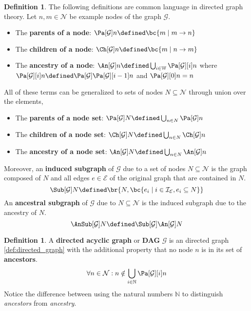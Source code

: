 \documentclass[aps, 10pt, english, twoside, pra, nofootinbib, longbibliography]{revtex4-1}
\theoremstyle{plain}
\theoremstyle{definition}
\newtheorem{definition}[theorem]{Definition}
\theoremstyle{remark}
\newcommand{\graph}{\mathcal{G}}
\newcommand{\nodes}{\mathcal{N}}
\newcommand{\edges}{\mathcal{E}}
\newcommand{\ind}{\mathcal{I}}
\newcommand{\term}[1]{\textcolor{Mahogany}{\textbf{#1}}}
\begin{document}
    \begin{definition}
        \label{def:graph_terms}
        The following definitions are common language in directed graph theory. Let $n, m \in \nodes$ be example nodes of the graph $\graph$.
        \begin{itemize}
            \item The \term{parents of a node}: $\Pa[\graph]{n} \defined \bc{m \mid m \to n}$
            \item The \term{children of a node}: $\Ch[\graph]{n} \defined \bc{m \mid n \to m}$
            \item The \term{ancestry of a node}: $\An[\graph]{n} \defined \bigcup_{i\in\mathbb{W}} \Pa[\graph][i]{n}$ where $\Pa[\graph][i]{n} \defined \Pa[\graph]{\Pa[\graph][i-1]{n}}$ and $\Pa[\graph][0]{n} = n$
        \end{itemize}
        All of these terms can be generalized to sets of nodes $N \subseteq \nodes$ through union over the elements,
        \begin{itemize}
            \item The \term{parents of a node set}: $\Pa[\graph]{N} \defined \bigcup_{n\in N}\Pa[\graph]{n}$
            \item The \term{children of a node set}: $\Ch[\graph]{N} \defined \bigcup_{n\in N}\Ch[\graph]{n}$
            \item The \term{ancestry of a node set}: $\An[\graph]{N} \defined \bigcup_{n\in N}\An[\graph]{n}$
        \end{itemize}
        Moreover, an \term{induced subgraph} of $\graph$ due to a set of nodes $N \subseteq \nodes$ is the graph composed of $N$ and all edges $e \in \edges$ of the original graph that are contained in $N$.
        \[ \Sub[\graph]{N} \defined \br{N, \bc{e_i \mid i \in \ind_\edges, e_i \subseteq N}}\]
        An \term{ancestral subgraph} of $\graph$ due to $N \subseteq \nodes$ is the induced subgraph due to the ancestry of $N$.
        \[ \AnSub[\graph]{N} \defined \Sub[\graph]{\An[\graph]{N}} \]
    \end{definition}

    \begin{definition}
        \label{def:dag}
        A \term{directed acyclic graph} or \term{DAG} $\graph$ is an directed graph \cref{def:directed_graph} with the additional property that no node $n$ is in its set of \term{ancestors}.
        \[ \forall n \in \nodes : n \notin \bigcup_{i\in\mathbb{N}} \Pa[\graph][i]{n}\]
        Notice the difference between using the natural numbers $\mathbb{N}$ to distinguish \textit{ancestors} from \textit{ancestry}.
    \end{definition}
\end{document}
